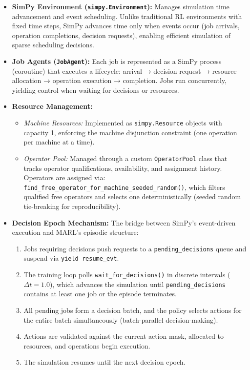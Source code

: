 \begin{itemize}
\item \textbf{SimPy Environment (\texttt{simpy.Environment}):} Manages simulation time advancement and event scheduling. Unlike traditional RL environments with fixed time steps, SimPy advances time only when events occur (job arrivals, operation completions, decision requests), enabling efficient simulation of sparse scheduling decisions.

\item \textbf{Job Agents (\texttt{JobAgent}):} Each job is represented as a SimPy process (coroutine) that executes a lifecycle: arrival → decision request → resource allocation → operation execution → completion. Jobs run concurrently, yielding control when waiting for decisions or resources.

\item \textbf{Resource Management:} 
\begin{itemize}
    \item \textit{Machine Resources:} Implemented as \texttt{simpy.Resource} objects with capacity 1, enforcing the machine disjunction constraint (one operation per machine at a time).
    \item \textit{Operator Pool:} Managed through a custom \texttt{OperatorPool} class that tracks operator qualifications, availability, and assignment history. Operators are assigned via:
     \texttt{find\_free\_operator\_for\_machine\_seeded\_random()}, which filters qualified free operators and selects one deterministically (seeded random tie-breaking for reproducibility).
\end{itemize}

\item \textbf{Decision Epoch Mechanism:} The bridge between SimPy's event-driven execution and MARL's episodic structure:
\begin{enumerate}
    \item Jobs requiring decisions push requests to a \texttt{pending\_decisions} queue and suspend via \texttt{yield resume\_evt}.
    \item The training loop polls \texttt{wait\_for\_decisions()} in discrete intervals (\(\Delta t = 1.0\)), which advances the simulation until \texttt{pending\_decisions} contains at least one job or the episode terminates.
    \item All pending jobs form a decision batch, and the policy selects actions for the entire batch simultaneously (batch-parallel decision-making).
    \item Actions are validated against the current action mask, allocated to resources, and operations begin execution.
    \item The simulation resumes until the next decision epoch.
\end{enumerate}


\end{itemize}
